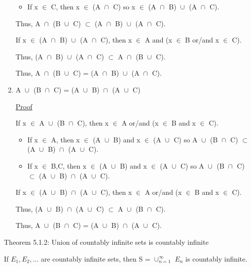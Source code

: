 \begin{enumerate}[label=(\alph*), leftmargin=2cm, itemsep=0.4em]
\begin{itemize}[leftmargin=1cm, itemsep=0.4em]
					\item If x $\in$ C, then x $\in$ (A $\cap_{}^{}$ C) so
						x $\in$ (A $\cap_{}^{}$ B) $\cup_{}^{}$ (A $\cap_{}^{}$ C).
				\end{itemize}
				Thus, A $\cap_{}^{}$ (B $\cup_{}^{}$ C)
				$\subset$ (A $\cap_{}^{}$ B) $\cup_{}^{}$ (A $\cap_{}^{}$ C).
				
				If x $\in$ (A $\cap_{}^{}$ B) $\cup_{}^{}$ (A $\cap_{}^{}$ C),
				then x $\in$ A and (x $\in$ B or/and x $\in$ C).

				Thus, (A $\cap_{}^{}$ B) $\cup_{}^{}$ (A $\cap_{}^{}$ C)
				$\subset$ A $\cap_{}^{}$ (B $\cup_{}^{}$ C).

				Thus, A $\cap_{}^{}$ (B $\cup_{}^{}$ C)
				= (A $\cap_{}^{}$ B) $\cup_{}^{}$ (A $\cap_{}^{}$ C).

		\item A $\cup_{}^{}$ (B $\cap_{}^{}$ C) = (A $\cup_{}^{}$ B) $\cap_{}^{}$ (A $\cup_{}^{}$ C)

			{ \color{magenta} \underline{Proof} } 
			
			If x $\in$ A $\cup_{}^{}$ (B $\cap_{}^{}$ C), then
			x $\in$ A or/and (x $\in$ B and x $\in$ C).
			\begin{itemize}[leftmargin=1cm, itemsep=0.4em]
				\item If x $\in$ A, then x $\in$ (A $\cup_{}^{}$ B)
					and x $\in$ (A $\cup_{}^{}$ C)
					so A $\cup_{}^{}$ (B $\cap_{}^{}$ C) $\subset$
					(A $\cup_{}^{}$ B) $\cap_{}^{}$ (A $\cup_{}^{}$ C).

				\item If x $\in$ B,C, then x $\in$ (A $\cup_{}^{}$ B)
					and x $\in$ (A $\cup_{}^{}$ C)
					so A $\cup_{}^{}$ (B $\cap_{}^{}$ C) $\subset$
					(A $\cup_{}^{}$ B) $\cap_{}^{}$ (A $\cup_{}^{}$ C).
			\end{itemize}
			If x $\in$ (A $\cup_{}^{}$ B) $\cap_{}^{}$ (A $\cup_{}^{}$ C), then
			x $\in$ A or/and (x $\in$ B and x $\in$ C).

			Thus, (A $\cup_{}^{}$ B) $\cap_{}^{}$ (A $\cup_{}^{}$ C)
			$\subset$ A $\cup_{}^{}$ (B $\cap_{}^{}$ C).

			Thus, A $\cup_{}^{}$ (B $\cap_{}^{}$ C)
			= (A $\cup_{}^{}$ B) $\cap_{}^{}$ (A $\cup_{}^{}$ C).
	\end{enumerate}

\newpage

{ \color{red} Theorem 5.1.2: Union of countably infinite sets is countably infinite } 

	\begin{adjustbox}{minipage=14cm, right}
		If $E_1, E_2, ... $ are countably infinite sets, then S = $\cup_{n=1}^{\infty}$ $E_n$
		is countably infinite.
	\end{adjustbox}

